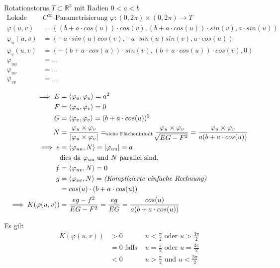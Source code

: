 \documentclass[../main.tex]{subfiles}
\begin{document}
\begin{example}
    Rotationstorus $T\subset\mathbb{R}^{3}$ mit Radien $0<a<b$
    \begin{align*}
        \text{Lokale }& C^{\infty}\text{-Parametrisierung }\varphi:(0,2\pi)\times(0,2\pi)\rightarrow T\\
        \varphi(u,v) &= ((b+a\cdot cos(u))\cdot cos(v), (b+a\cdot cos(u))\cdot sin(v), a\cdot sin(u))\\
        \varphi_{u}(u,v) &= (-a\cdot sin(u)cos(v), -a\cdot sin(u)sin(v), a\cdot cos(u))\\
        \varphi_{v}(u,v) &= (-(b+a\cdot cos(u))\cdot sin(v), (b+a\cdot cos(u))\cdot cos(v), 0)\\
        \varphi_{uu} &= \dots\\
        \varphi_{uv} &= \dots\\
        \varphi_{vv} &= \dots\\
    \end{align*}
    \begin{align*}
        \implies E &= \langle \varphi_{u}, \varphi_{u}\rangle = a^{2}\\
        F &= \langle \varphi_{u}, \varphi_{v}\rangle = 0\\
        G &= \langle \varphi_{v}, \varphi_{v}\rangle = (b+a\cdot cos(u))^{2}\\
        N &= \frac{\varphi_{u}\times\varphi_{v}}{\lvert\varphi_{u}\times\varphi_{v}\rvert} =_{\text{siehe Flächeninhalt}} \frac{\varphi_{u}\times\varphi_{v}}{\sqrt[]{EG-F^{2}}} = \frac{\varphi_{u}\times\varphi_{v}}{a(b+a\cdot cos(u))}\\
        \implies e &= \langle\varphi_{uu}, N\rangle = \lvert\varphi_{uu}\rvert = a\\
        &\text{dies da }\varphi_{uu} \text{ und }N \text{ parallel sind.}\\
        f &= \langle\varphi_{uv},N\rangle = 0\\
        g &= \langle\varphi_{vv},N\rangle = \text{\emph{(Komplizierte einfache Rechnung)}} \\
        &= cos(u)\cdot(b+a\cdot cos(u))\\
        \implies K(\varphi(u,v)) &= \frac{eg-f^{2}}{EG-F^{2}} = \frac{eg}{EG} = \frac{cos(u)}{a(b+a\cdot cos(u))}
    \end{align*}
\end{example}
\begin{remark}
    Es gilt \begin{align*}
        K(\varphi(u,v)) &> 0    &u < \frac{\pi}{2} \text{ oder } u>\frac{3\pi}{2}\\
        &=0 \text{ falls } &u = \frac{\pi}{2} \text{ oder } u=\frac{3\pi}{2}\\
        &<0 &u> \frac{\pi}{2} \text{ und } u<\frac{3\pi}{2}
    \end{align*}
\end{remark}
\end{document}
